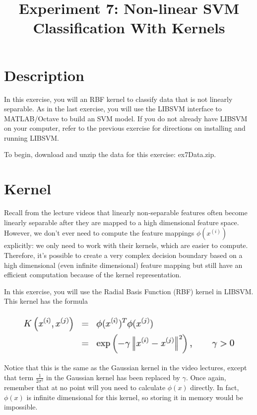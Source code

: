 \documentclass[10pt,a4paper]{article}
\begin{document}
\title{Experiment 7: Non-linear SVM Classification With Kernels}

\maketitle
  
\section{Description}
%
  In this exercise, you will an RBF kernel to classify data that is not linearly separable. As in the last exercise, you will use the LIBSVM interface to MATLAB/Octave to build an SVM model. If you do not already have LIBSVM on your computer, refer to the previous exercise for directions on installing and running LIBSVM.

  To begin, download and unzip the data for this exercise: ex7Data.zip.
  


\section{Kernel}
%
  Recall from the lecture videos that linearly non-separable features often become linearly separable after they are mapped to a high dimensional feature space. However, we don't ever need to compute the feature mappings $\phi(x^{(i)})$ explicitly: we only need to work with their kernels, which are easier to compute. Therefore, it's possible to create a very complex decision boundary based on a high dimensional (even infinite dimensional) feature mapping but still have an efficient computation because of the kernel representation.

  In this exercise, you will use the Radial Basis Function (RBF) kernel in LIBSVM. This kernel has the formula
  \begin{figure}[htb!]
    \centering
      \includegraphics[width=.7\columnwidth]{img81}
  \end{figure}
  
  Notice that this is the same as the Gaussian kernel in the video lectures, except that term  $\frac{1}{2\sigma^2}$ in the Gaussian kernel has been replaced by $\gamma$. Once again, remember that at no point will you need to calculate $\phi(x)$ directly. In fact, $\phi(x)$ is infinite dimensional for this kernel, so storing it in memory would be impossible.
\end{document}
